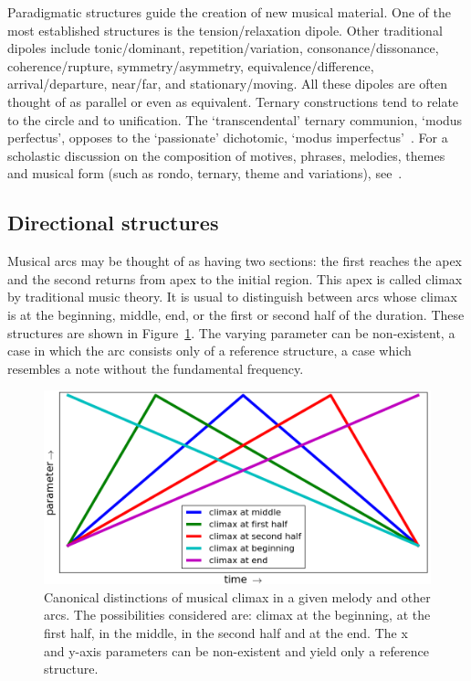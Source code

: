 Paradigmatic structures guide the creation of new musical material.
One of the most established structures is the tension/relaxation dipole.
Other traditional dipoles include tonic/dominant, repetition/variation,
consonance/dissonance, coherence/rupture, symmetry/asymmetry,
equivalence/difference, arrival/departure, near/far, and stationary/moving.
All these dipoles are often thought of as parallel or even as equivalent.
Ternary constructions tend to relate to the circle and to unification. The
`transcendental' ternary communion, `modus perfectus', opposes to the `passionate'
dichotomic, `modus imperfectus'~\cite{apel}.
For a scholastic discussion on the composition of motives,
phrases, melodies, themes and musical form (such as rondo, ternary, theme and variations), see~\cite{Schoenberg}.

\subsection{Directional structures}\label{subsec:dir}
Musical arcs may be thought of as having two sections: the first reaches the apex and the second returns from apex to the initial region.
This apex is called climax by traditional music theory. It is
usual to distinguish between arcs whose climax is at the beginning, middle, end,
or the first or second half of the duration. These structures are
shown in Figure~\ref{fig:climax}. The varying parameter can be non-existent, a case in which
the arc consists only of a reference structure, a case which resembles a note without the fundamental frequency.~\cite{Schoenberg}

\begin{figure}
    \centering
        \includegraphics[width=.8\columnwidth]{figures/climax_}
        \caption{Canonical distinctions of musical climax in a given melody and
        other arcs. The possibilities considered are: climax at the beginning, at the first half, in the middle, in the second half and 
        at the end. The x and y-axis parameters can be non-existent and yield only a reference structure.}
        \label{fig:climax}
\end{figure}


